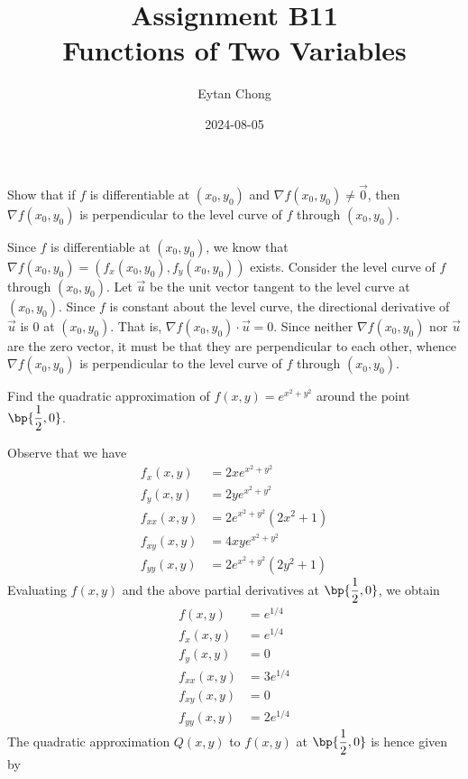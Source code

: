 \documentclass{echw}
\title{Assignment B11\\Functions of Two Variables}
\author{Eytan Chong}
\date{2024-08-05}
\begin{document}
    \problem{}
        Show that if $f$ is differentiable at $(x_0, y_0)$ and $\nabla f(x_0, y_0) \neq \vec 0$, then $\nabla f(x_0, y_0)$ is perpendicular to the level curve of $f$ through $(x_0, y_0)$.

    \solution
        Since $f$ is differentiable at $(x_0, y_0)$, we know that $\nabla f(x_0, y_0) = (f_x(x_0, y_0), f_y(x_0, y_0))$ exists. Consider the level curve of $f$ through $(x_0, y_0)$. Let $\vec u$ be the unit vector tangent to the level curve at $(x_0, y_0)$. Since $f$ is constant about the level curve, the directional derivative of $\vec u$ is 0 at $(x_0, y_0)$. That is, $\nabla f(x_0, y_0) \cdot \vec u = 0$. Since neither $\nabla f(x_0, y_0)$ nor $\vec u$ are the zero vector, it must be that they are perpendicular to each other, whence $\nabla f(x_0, y_0)$ is perpendicular to the level curve of $f$ through $(x_0, y_0)$.

    \problem{}
        Find the quadratic approximation of $f(x, y) = e^{x^2 + y^2}$ around the point $\bp{\dfrac12, 0}$.

    \solution
        Observe that we have
        \begin{align*}
            f_x(x, y) &= 2xe^{x^2 + y^2}\\
            f_y(x, y) &= 2ye^{x^2 + y^2}\\
            f_{xx}(x, y) &= 2e^{x^2 + y^2}(2x^2 + 1)\\
            f_{xy}(x, y) &= 4xye^{x^2 + y^2}\\
            f_{yy}(x, y) &= 2e^{x^2 + y^2}(2y^2 + 1)
        \end{align*}
        Evaluating $f(x, y)$ and the above partial derivatives at $\bp{\dfrac12, 0}$, we obtain
        \begin{align*}
            f(x, y) &= e^{1/4}\\
            f_x(x, y) &= e^{1/4}\\
            f_y(x, y) &= 0\\
            f_{xx}(x, y) &= 3e^{1/4}\\
            f_{xy}(x, y) &= 0\\
            f_{yy}(x, y) &= 2e^{1/4}
        \end{align*}
        The quadratic approximation $Q(x, y)$ to $f(x, y)$ at $\bp{\dfrac12, 0}$ is hence given by
\end{document}
